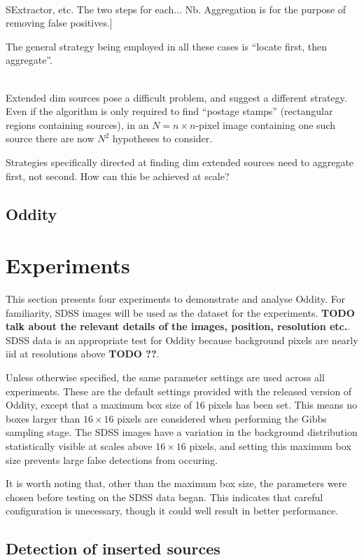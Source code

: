 \documentclass[manuscript]{aastex}
\newcommand{\TODO}[1]{\textbf{TODO #1}}
\newcommand{\para}[1]{{\sc{#1}\\}}
\begin{document}
\para{examples} SExtractor, etc. The two steps for each... Nb. Aggregation is for the purpose of removing false positives.]

The general strategy being employed in all these cases is ``locate first, then aggregate''.

\para{our approach is different}
Extended dim sources pose a difficult problem, and suggest a different strategy. Even if the algorithm is only required to find ``postage stamps'' (rectangular regions containing sources), in an $N=n \times n$-pixel image containing one such source there are now $N^2$ hypotheses to consider.

Strategies specifically directed at finding dim extended sources need
to aggregate first, not second. How can this be achieved at scale?

\subsection{Oddity}

\section{Experiments}

This section presents four experiments to demonstrate and analyse Oddity. For familiarity, SDSS images will be used as the dataset for the experiments. \TODO{talk about the relevant details of the images, position, resolution etc.}. SDSS data is an appropriate test for Oddity because background pixels are nearly iid at resolutions above \TODO{??}.

Unless otherwise specified, the same parameter settings are used across all experiments. These are the default settings provided with the released version of Oddity, except that a maximum box size of 16 pixels has been set. This means no boxes larger than $16\times16$ pixels are considered when performing the Gibbs sampling stage. The SDSS images have a variation in the background distribution statistically visible at scales above $16 \times 16$ pixels, and setting this maximum box size prevents large false detections from occuring.

It is worth noting that, other than the maximum box size, the parameters were chosen before testing on the SDSS data began. This indicates that careful configuration is unecessary, though it could well result in better performance.

\subsection{Detection of inserted sources}
\end{document}
